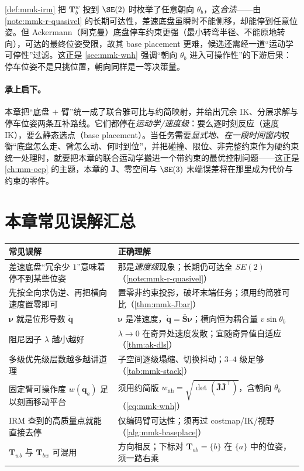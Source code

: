\begin{note}\label{note:mmk-nonholo-baseplace}
\cref{def:mmk-irm} 把 $\mathbf{T}_b^w$ 投到 $\SE(2)$ 时枚举了任意朝向 $\theta_b$，这\emph{合法}——由 \cref{note:mmk-r-quasivel} 的长期可达性，差速底盘虽瞬时不能侧移，却能停到任意位姿。但 Ackermann（阿克曼）底盘停车约束更强（最小转弯半径、不能原地转向），可达的最终位姿受限，故其 base placement 更难，候选还需经一道“运动学可停性”过滤。这正是 \cref{sec:mmk-wnh} 强调“朝向 $\theta_b$ 进入可操作性”的下游后果：停车位姿不是只挑位置，朝向同样是一等决策量。
\end{note}

\paragraph{承上启下。}
本章把“底盘 $+$ 臂”统一成了联合雅可比与约简映射，并给出冗余 IK、分层求解与停车位姿两条互补路线。它们都停在\emph{运动学/速度级}：要么逐时刻反应（速度 IK），要么静态选点（base placement）。当任务需要\emph{显式地、在一段时间窗内}权衡“底盘怎么走、臂怎么动、何时到位”，并把碰撞、限位、非完整约束作为硬约束统一处理时，就要把本章的联合运动学搬进一个带约束的最优控制问题——这正是 \cref{ch:mm-ocp} 的主题，本章的 $\bar{\mathbf{J}}$、零空间与 $\SE(3)$ 末端误差将在那里成为代价与约束的零件。

\section*{本章常见误解汇总}
\begin{table}[H]\centering\small
\begin{tabular}{p{} p{}}
\toprule
\textbf{常见误解} & \textbf{正确理解} \\
\midrule
差速底盘“冗余少 $1$”意味着停不到某些位姿 & 那是\emph{速度级}现象；长期仍可达全 $SE(2)$（\cref{note:mmk-r-quasivel}）\\
先按全向求伪逆、再把横向速度置零即可 & 置零非约束投影，破坏末端任务；须用约简雅可比（\cref{thm:mmk-Jbar}）\\
$\boldsymbol{\nu}$ 就是位形导数 $\dot{\mathbf{q}}$ & $\boldsymbol{\nu}$ 是准速度，$\dot{\mathbf{q}}=\bar{\mathbf{S}}\boldsymbol{\nu}$；横向恒为耦合量 $v\sin\theta_b$ \\
阻尼因子 $\lambda$ 越小越好 & $\lambda\to0$ 在奇异处速度发散；宜随奇异值自适应（\cref{thm:ak-dls}）\\
多级优先级层数越多越讲道理 & 子空间逐级塌缩、切换抖动；$3$--$4$ 级足够（\cref{tab:mmk-stack}）\\
固定臂可操作度 $w(\mathbf{q}_a)$ 足以刻画移动平台 & 须用约简版 $w_{\text{nh}}=\sqrt{\det(\bar{\mathbf{J}}\bar{\mathbf{J}}^\top)}$，含朝向 $\theta_b$（\cref{eq:mmk-wnh}）\\
IRM 查到的高质量点就能直接去停 & 仅编码臂可达性；须再过 costmap/IK/视野（\cref{alg:mmk-baseplace}）\\
$\mathbf{T}_{wb}$ 与 $\mathbf{T}_{bw}$ 可混用 & 方向相反；下标对 $\mathbf{T}_{ab}=\{b\}$ 在 $\{a\}$ 中的位姿，须一路右乘 \\
\bottomrule
\end{tabular}
\end{table}

